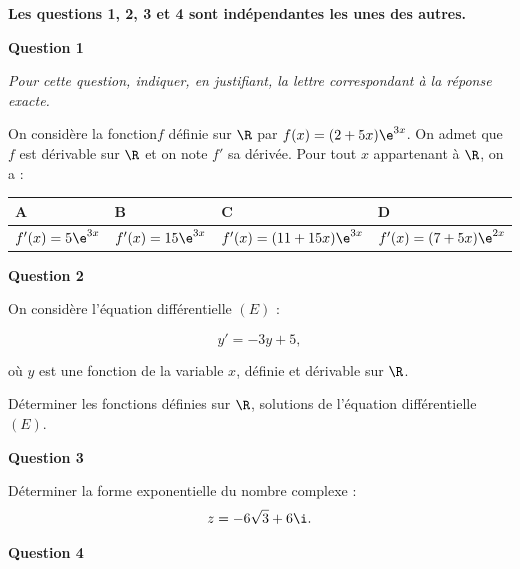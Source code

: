 \medskip

\textbf{Les questions 1, 2, 3 et 4 sont indépendantes les unes des autres.}

\bigskip

\textbf{Question 1}

\medskip

\emph{Pour cette question, indiquer, en justifiant, la lettre correspondant à la réponse exacte.}

\medskip

On considère la fonction$f$ définie sur $\R$ par $f(x)=(2 + 5x)\e^{3x}$.
On admet que $f$ est dérivable sur $\R$ et on note $f'$ sa dérivée.
Pour tout $x$ appartenant à $\R$, on a :

\renewcommand\arraystretch{1.6}
\begin{tabularx}{\linewidth}{|*{4}{>{\centering \arraybackslash}X|}}\hline
A&B&C&D\\\hline
$f'(x) = 5\e^{3x}$&$f'(x) = 15\e^{3x}$&
$f'(x) = (11 + 15x)\e^{3x}$&$f'(x) = (7 + 5x)\e^{2x}$\\\hline
\end{tabularx}
\renewcommand\arraystretch{1}

\bigskip

\textbf{Question 2}

\medskip

On considère l'équation différentielle $(E)$ :

\[y' = - 3y + 5,\]

où $y$ est une fonction de la variable $x$, définie et dérivable sur $\R$.

Déterminer les fonctions définies sur $\R$, solutions de l'équation différentielle $(E)$.

\bigskip

\textbf{Question 3}

\medskip

Déterminer la forme exponentielle du nombre complexe :
\[z = -6\sqrt{3} + 6\i.\]

\bigskip

\textbf{Question 4}

\medskip

